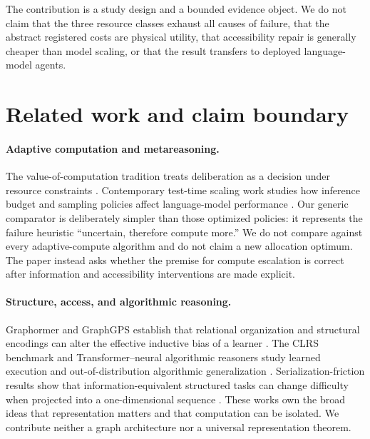 \documentclass[10pt]{article}
\begin{document}
The contribution is a study design and a bounded evidence object. We do not claim that the three resource classes exhaust all causes of failure, that the abstract registered costs are physical utility, that accessibility repair is generally cheaper than model scaling, or that the result transfers to deployed language-model agents.

\section{Related work and claim boundary}

\paragraph{Adaptive computation and metareasoning.}
The value-of-computation tradition treats deliberation as a decision under resource constraints \citep{russell1991dowhat}. Contemporary test-time scaling work studies how inference budget and sampling policies affect language-model performance \citep{snell2024testtime,brown2024monkeys}. Our generic comparator is deliberately simpler than those optimized policies: it represents the failure heuristic ``uncertain, therefore compute more.'' We do not compare against every adaptive-compute algorithm and do not claim a new allocation optimum. The paper instead asks whether the premise for compute escalation is correct after information and accessibility interventions are made explicit.

\paragraph{Structure, access, and algorithmic reasoning.}
Graphormer and GraphGPS establish that relational organization and structural encodings can alter the effective inductive bias of a learner \citep{ying2021graphormer,rampasek2022gps}. The CLRS benchmark and Transformer--neural algorithmic reasoners study learned execution and out-of-distribution algorithmic generalization \citep{velickovic2022clrs,bounsi2024transnar}. Serialization-friction results show that information-equivalent structured tasks can change difficulty when projected into a one-dimensional sequence \citep{lo2026serialization}. These works own the broad ideas that representation matters and that computation can be isolated. We contribute neither a graph architecture nor a universal representation theorem.
\end{document}
